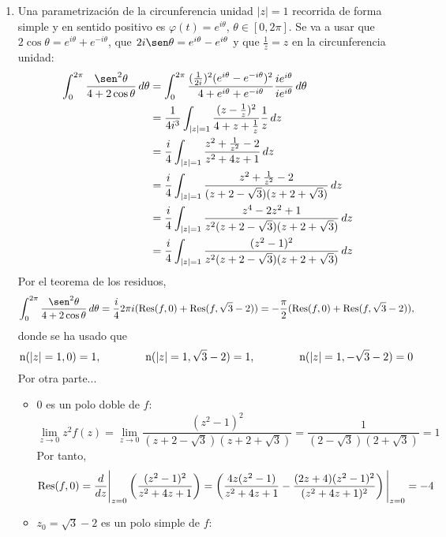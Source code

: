 \documentclass[11pt]{report}
\makeatletter
\renewenvironment{proof}[1][\proofname]{\par
  \pushQED{\qed}%
  \normalfont \topsep\z@skip %
  \trivlist
  \item[\hskip\labelsep
        \itshape
    #1\@addpunct{.}]\ignorespaces
}{%
  \popQED\endtrivlist\@endpefalse
}
\makeatother
\begin{document}
\begin{proof}
  \hfill
  \begin{enumerate}
    \item Una parametrización de la circunferencia unidad $|z|=1$ recorrida de forma simple y en sentido positivo es $\varphi(t)=e^{i\theta}$, $\theta \in [0,2\pi]$. Se va a usar que $2\cos\theta = e^{i\theta}+e^{-i\theta}$, que $2i\sen\theta = e^{i\theta}-e^{i\theta}$ y que $\frac{1}{z}=z$ en la circunferencia unidad:
    \[
    \begin{aligned}[t]
    \int_{0}^{2\pi} \frac{\sen^2 \theta}{4+2\cos\theta} \, d\theta &= \int_0^{2\pi}\frac{(\frac{1}{2i})^2(e^{i\theta}-e^{-i\theta})^2}{4+e^{i\theta}+e^{-i\theta}}\frac{ie^{i\theta}}{ie^{i\theta}} \, d\theta \\
    &=\frac{1}{4i^3} \int_{|z|=1} \frac{(z-\frac{1}{z})^2}{4+z+\frac{1}{z}}\frac{1}{z} \, dz \\
    &= \frac{i}{4}\int_{|z|=1} \frac{z^2+\frac{1}{z^2}-2}{z^2+4z+1} \, dz \\
    &= \frac{i}{4}\int_{|z|=1} \frac{z^2+\frac{1}{z^2}-2}{(z+2-\sqrt{3})(z+2+\sqrt{3})} \, dz \\
    &= \frac{i}{4}\int_{|z|=1} \frac{z^4-2z^2+1}{z^2(z+2-\sqrt{3})(z+2+\sqrt{3})} \, dz \\
    &= \frac{i}{4}\int_{|z|=1} \frac{(z^2-1)^2}{z^2(z+2-\sqrt{3})(z+2+\sqrt{3})} \, dz 
    \end{aligned}  
    \]
    Por el teorema de los residuos,   \[\int_{0}^{2\pi} \frac{\sen^2 \theta}{4+2\cos\theta} \, d\theta =\frac{i}{4}2\pi i(\textup{Res}(f,0)+\textup{Res}(f,\sqrt{3}-2)) = -\frac{\pi}{2}(\textup{Res}(f,0)+\textup{Res}(f,\sqrt{3}-2)) ,\]
    donde se ha usado que 
    \[\textup{n}(|z|=1,0) = 1, \qquad \qquad \textup{n}(|z|=1,\sqrt{3}-2) = 1, \qquad \qquad\textup{n}(|z|=1,-\sqrt{3}-2) = 0\]
    Por otra parte...
    \begin{itemize}
      \item $0$ es un polo doble de $f$:
      \[\lim_{z \to 0} z^2f(z)=\lim_{z \to 0}\frac{(z^2-1)^2}{(z+2-\sqrt{3})(z+2+\sqrt{3})} = \frac{1}{(2-\sqrt{3})(2+\sqrt{3})} = 1\]
      Por tanto,
      \[\begin{aligned}[t]
        \textup{Res}(f,0) = \frac{d}{dz} \Bigg|_{z=0}\left(\frac{(z^2-1)^2}{z^2+4z+1}\right)
        =\left(\frac{4z(z^2-1)}{z^2+4z+1}-\frac{(2z+4)(z^2-1)^2}{(z^2+4z+1)^2}\right)\Bigg|_{z=0} =-4
      \end{aligned}\]
      \item $z_0=\sqrt{3}-2$ es un polo simple de $f$:

\end{itemize}
\end{enumerate}
\end{proof}
\end{document}
